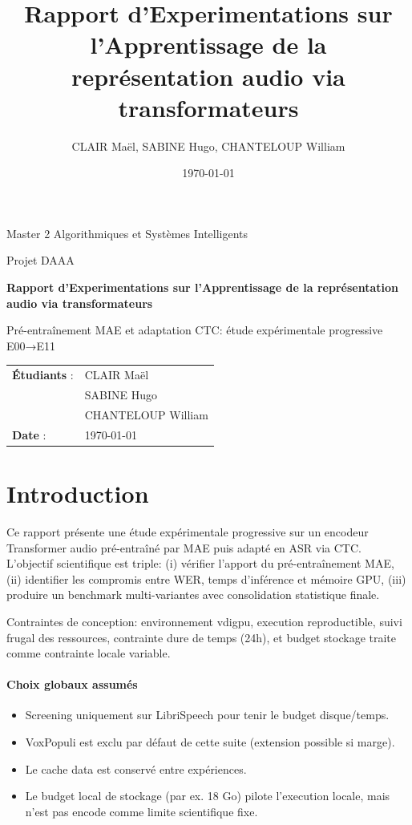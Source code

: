 \documentclass[11pt,a4paper]{article}
\title{Rapport d'Experimentations sur l'Apprentissage de la représentation audio via transformateurs}
\author{CLAIR Maël, SABINE Hugo, CHANTELOUP William}
\date{\today}
\begin{document}
\begin{titlepage}
\centering
{\Large Master 2 Algorithmiques et Systèmes Intelligents\par}
\vspace{0.35cm}
{\large Projet DAAA\par}
\vspace{1.3cm}
{\LARGE\bfseries Rapport d'Experimentations sur l'Apprentissage de la représentation audio via transformateurs\par}
\vspace{0.8cm}
{\large Pré-entraînement MAE et adaptation CTC: étude expérimentale progressive E00→E11\par}
\vfill
\begin{tabular}{ll}
\textbf{Étudiants} : & CLAIR Maël \\
 & SABINE Hugo \\
 & CHANTELOUP William \\
\textbf{Date} : & \today \\
\end{tabular}
\vfill
\end{titlepage}

\tableofcontents
\newpage

\section{Introduction}
Ce rapport présente une étude expérimentale progressive sur un encodeur Transformer audio pré-entraîné par MAE puis adapté en ASR via CTC.
L'objectif scientifique est triple: (i) vérifier l'apport du pré-entraînement MAE, (ii) identifier les compromis entre WER, temps d'inférence et mémoire GPU, (iii) produire un benchmark multi-variantes avec consolidation statistique finale.

Contraintes de conception: environnement vdigpu, execution reproductible, suivi frugal des ressources, contrainte dure de temps (24h), et budget stockage traite comme contrainte locale variable.

\paragraph{Choix globaux assumés}
\begin{itemize}
\item Screening uniquement sur LibriSpeech pour tenir le budget disque/temps.
\item VoxPopuli est exclu par défaut de cette suite (extension possible si marge).
\item Le cache data est conservé entre expériences.
\item Le budget local de stockage (par ex. 18 Go) pilote l'execution locale, mais n'est pas encode comme limite scientifique fixe.
\end{itemize}
\end{document}
